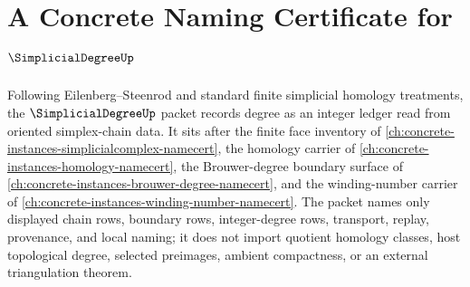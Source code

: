 \chapter{A Concrete Naming Certificate for $\SimplicialDegreeUp$}
\label{ch:concrete-instances-simplicial-degree-namecert}

Following Eilenberg--Steenrod and standard finite simplicial homology treatments, the $\SimplicialDegreeUp$ packet records degree as an integer ledger read from oriented simplex-chain data. It sits after the finite face inventory of \autoref{ch:concrete-instances-simplicialcomplex-namecert}, the homology carrier of \autoref{ch:concrete-instances-homology-namecert}, the Brouwer-degree boundary surface of \autoref{ch:concrete-instances-brouwer-degree-namecert}, and the winding-number carrier of \autoref{ch:concrete-instances-winding-number-namecert}. The packet names only displayed chain rows, boundary rows, integer-degree rows, transport, replay, provenance, and local naming; it does not import quotient homology classes, host topological degree, selected preimages, ambient compactness, or an external triangulation theorem.

